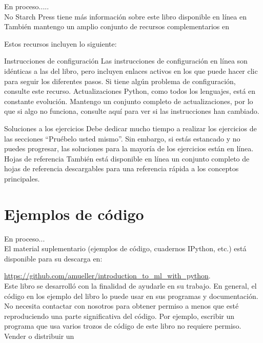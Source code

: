 En proceso.....\\

No Starch Press tiene más información sobre este libro disponible en línea en 
También mantengo un amplio conjunto de recursos complementarios en %

Estos recursos incluyen lo siguiente:

Instrucciones de configuración Las instrucciones de configuración en línea son idénticas a las del libro, pero incluyen enlaces activos en los que puede hacer clic para seguir los diferentes pasos. Si tiene algún problema de configuración, consulte este recurso.
Actualizaciones Python, como todos los lenguajes, está en constante evolución. Mantengo un conjunto completo de actualizaciones, por lo que si algo no funciona, consulte aquí para ver si las instrucciones han cambiado.

Soluciones a los ejercicios Debe dedicar mucho tiempo a realizar los ejercicios de las secciones “Pruébelo usted mismo”. Sin embargo, si estás estancado y no puedes progresar, las soluciones para la mayoría de los ejercicios están en línea.
Hojas de referencia También está disponible en línea un conjunto completo de hojas de referencia descargables para una referencia rápida a los conceptos principales.

\section*{Ejemplos de código}

En proceso...\\

El  material suplementario (ejemplos de código, cuadernos IPython, etc.) está disponible para su descarga en:


\hspace{0.5cm} \href{https://github.com/amueller/introduction_to_ml_with_python}{\color{vino} https://github.com/amueller/introduction\_to\_ml\_with\_python}.\\

Este libro se desarrolló con la finalidad de  ayudarle en  su trabajo. En general, el  código en los  ejemplo del libro lo puede usar en sus programas y documentación. No necesita contactar con nosotros para obtener permiso a menos que esté reproduciendo una parte significativa del código. Por ejemplo, escribir un programa que usa varios trozos de código de este libro no requiere permiso. Vender o distribuir un \\



